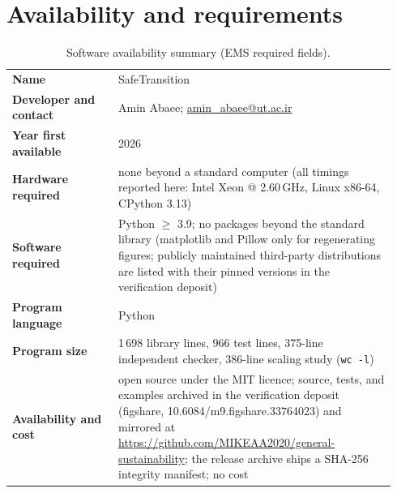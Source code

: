 \documentclass[3p,11pt]{elsarticle}
\begin{document}
\section{Availability and requirements}\label{sec:availability}

\begin{table}[h]
\centering
\small
\begin{tabular}{@{}p{0.26\linewidth}p{0.68\linewidth}@{}}
\toprule
\textbf{Name} & SafeTransition \\
\textbf{Developer and contact} & Amin Abaee;
\href{mailto:amin_abaee@ut.ac.ir}{amin\_abaee@ut.ac.ir} \\
\textbf{Year first available} & 2026 \\
\textbf{Hardware required} & none beyond a standard computer (all timings
reported here: Intel Xeon @ 2.60\,GHz, Linux x86-64, CPython 3.13) \\
\textbf{Software required} & Python $\geq$ 3.9; no packages beyond the
standard library (matplotlib and Pillow only for regenerating figures;
publicly maintained third-party distributions are listed with their pinned
versions in the verification deposit) \\
\textbf{Program language} & Python \\
\textbf{Program size} & 1\,698 library lines, 966 test lines, 375-line
independent checker, 386-line scaling study (\texttt{wc~-l}) \\
\textbf{Availability and cost} & open source under the MIT licence; source,
tests, and examples archived in the verification deposit
\citep{Deposit2026} (figshare, 10.6084/m9.figshare.33764023) and mirrored
at \url{https://github.com/MIKEAA2020/general-sustainability}; the
release archive ships a SHA-256 integrity manifest; no cost \\
\bottomrule
\end{tabular}
\caption{Software availability summary (EMS required fields).}
\label{tab:availability}
\end{table}
\end{document}
